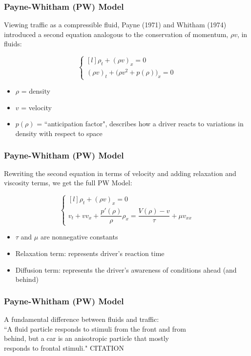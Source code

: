 \documentclass{beamer}
\begin{document}

\begin{frame}
\frametitle{Payne-Whitham (PW) Model}

Viewing traffic as a compressible fluid, Payne (1971) and Whitham (1974) introduced a second equation analogous to the conservation of momentum, $\rho v$, in fluids:

\[ \left\{ \begin{matrix*}[l] \rho_t + (\rho v)_x = 0 \\[2ex] (\rho v)_t + \Big(\rho v^2 + p(\rho)\Big)_x = 0 \end{matrix*} \right. \]

\begin{itemize}
\item $\rho$ = density
\item $v$ = velocity
\item $p(\rho)$ = ``anticipation factor", describes how a driver reacts to variations in density with respect to space
\end{itemize}

\end{frame}

\begin{frame}
\frametitle{Payne-Whitham (PW) Model}

Rewriting the second equation in terms of velocity and adding relaxation and viscosity terms, we get the full PW Model:

\[ \left\{ \begin{matrix*}[l] \rho_t + (\rho v)_x = 0 \\[2ex] v_t + v v_x + \dfrac{p'(\rho)}{\rho} \rho_x = \dfrac{V(\rho) - v}{\tau} + \mu v_{xx} \end{matrix*} \right. \]

\begin{itemize}
\item $\tau$ and $\mu$ are nonnegative constants
\item Relaxation term: represents driver's reaction time
\item Diffusion term: represents the driver's awareness of conditions ahead (and behind)
\end{itemize}

\end{frame}

\begin{frame}
\frametitle{Payne-Whitham (PW) Model}

\hspace{2em} A fundamental difference between fluids and traffic: \\[3ex]

\hspace{2em} ``A fluid particle responds to stimuli from the front and from \\ 
\hspace{2em} behind, but a car is an anisotropic particle that mostly \\
\hspace{2em} responds to frontal stimuli." CITATION

\end{frame}
\end{document}
